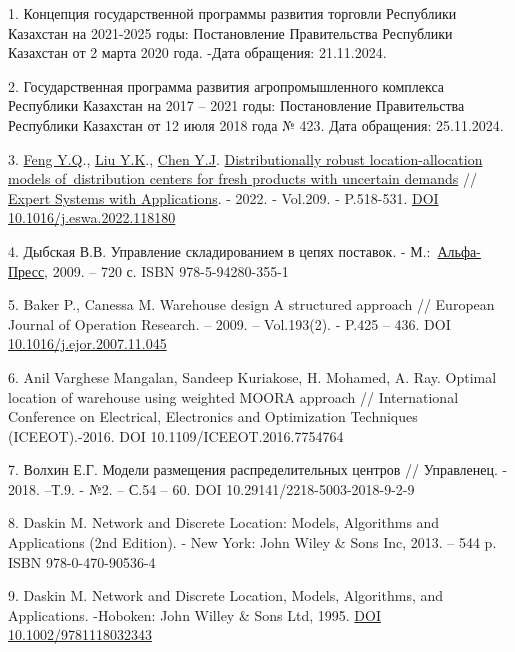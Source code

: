\begin{references}
1. Концепция государственной программы развития торговли Республики
Казахстан на 2021-2025 годы: Постановление Правительства Республики
Казахстан от 2 марта 2020 года.
\href{https://www.gov.kz/memleket/entities/mti/documents/details/61426?lang=ru}{}
-Дата обращения: 21.11.2024.

2. Государственная программа развития агропромышленного комплекса
Республики Казахстан на 2017 -- 2021 годы: Постановление Правительства
Республики Казахстан от 12 июля 2018 года № 423.
\href{https://adilet.zan.kz/rus/docs/P1800000423-}{}
Дата обращения: 25.11.2024.

3. \href{https://www.webofscience.com/wos/author/record/34864370}{Feng
Y.Q}.,
\href{https://www.webofscience.com/wos/author/record/33997583}{Liu
Y.K}.,
\href{https://www.webofscience.com/wos/author/record/34807908}{Chen
Y.J}.
\href{https://www.webofscience.com/wos/woscc/full-record/WOS:000859686100002}{Distributionally
robust location-allocation models of~distribution centers for fresh
products with uncertain demands} //
\href{https://www.sciencedirect.com/journal/expert-systems-with-applications}{Expert
Systems with Applications}. - 2022. - Vol.209. - P.518-531.
\href{https://doi.org/10.1016/j.eswa.2022.118180}{DOI
10.1016/j.eswa.2022.118180}

4. Дыбская В.В. Управление складированием в цепях поставок. -
М.:~\href{https://publications.hse.ru/books/?pb=57130529}{Альфа-Пресс},
2009. -- 720 с. ISBN 978-5-94280-355-1

5. Baker P., Canessa M. Warehouse design A structured approach //
European Journal of Operation Research. -- 2009. -- Vol.193(2). -
P.425 -- 436. DOI
\href{http://dx.doi.org/10.1016/j.ejor.2007.11.045}{10.1016/j.ejor.2007.11.045}

6. Anil Varghese Mangalan, Sandeep Kuriakose, H. Mohamed, A. Ray. Optimal
location of warehouse using weighted MOORA approach // International
Conference on Electrical, Electronics and Optimization Techniques
(ICEEOT).-2016. DOI 10.1109/ICEEOT.2016.7754764

7. Волхин Е.Г. Модели размещения распределительных центров // Управленец.
- 2018. --Т.9. - №2. -- С.54 -- 60. DOI 10.29141/2218-5003-2018-9-2-9

8. Daskin M. Network and Discrete Location: Models, Algorithms and
Applications (2nd Edition). - New York: John Wiley \& Sons Inc, 2013.
-- 544 p. ISBN 978-0-470-90536-4

9. Daskin M. Network and Discrete Location, Models, Algorithms, and
Applications. -Hoboken: John Willey \& Sons Ltd, 1995.
\href{http://dx.doi.org/10.1002/9781118032343}{DOI
10.1002/9781118032343}


\end{references}
